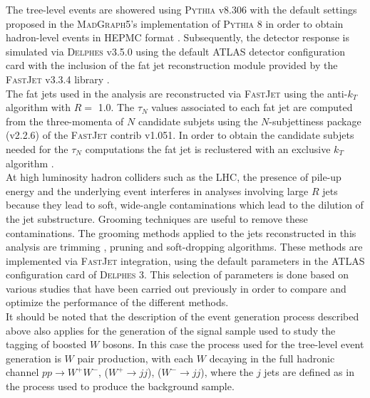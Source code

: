 \documentclass[main]{subfiles} %
\begin{document}

The tree-level events are showered using \textsc{Pythia} v8.306 \cite{Sjostrand2015} with the default settings proposed in the \textsc{MadGraph5}'s implementation of \textsc{Pythia 8} in order to obtain hadron-level events in \textsc{HEPMC} format \cite{Dobbs2001}. Subsequently, the detector response is simulated via \textsc{Delphes} v3.5.0 \cite{deFavereau2014} using the default ATLAS detector configuration card with the inclusion of the fat jet reconstruction module provided by the \textsc{FastJet} v3.3.4 library \cite{Cacciari2012}.\\

The fat jets used in the analysis are reconstructed via \textsc{FastJet} using the anti-$k_T$ algorithm with $R =$ 1.0. The $\tau_N$ values associated to each fat jet are computed from the three-momenta of $N$ candidate subjets using the $N$-subjettiness package (v2.2.6) of the \textsc{FastJet} contrib v1.051. In order to obtain the candidate subjets needed for the $\tau_N$ computations the fat jet is reclustered with an exclusive $k_T$ algorithm \cite{Khelifa-Kerfa2022}. \\


At high luminosity hadron colliders such as the LHC, the presence of pile-up energy and the underlying event interferes in analyses involving large $R$ jets because they lead to soft, wide-angle contaminations which lead to the dilution of the jet substructure. Grooming techniques are useful to remove these contaminations. The grooming methods applied to the jets reconstructed in this analysis are trimming \cite{Krohn2010}, pruning \cite{Ellis2009} and soft-dropping \cite{Larkoski2014} algorithms. These methods are implemented via \textsc{FastJet} integration, using the default parameters in the ATLAS configuration card of \textsc{Delphes 3}. This selection of parameters is done based on various studies that have been carried out previously in order to compare and optimize the performance of the different methods.\\

It should be noted that the description of the event generation process described above also applies for the generation of the signal sample used to study the tagging of boosted $W$ bosons. In this case the process used for the tree-level event generation is $W$ pair production, with each $W$ decaying in the full hadronic channel $pp \rightarrow W^{+}W^{-}$, ($W^{+} \rightarrow jj$), ($W^{-} \rightarrow jj$), where the $j$ jets are defined as in the process used to produce the background sample.\\
\end{document}
